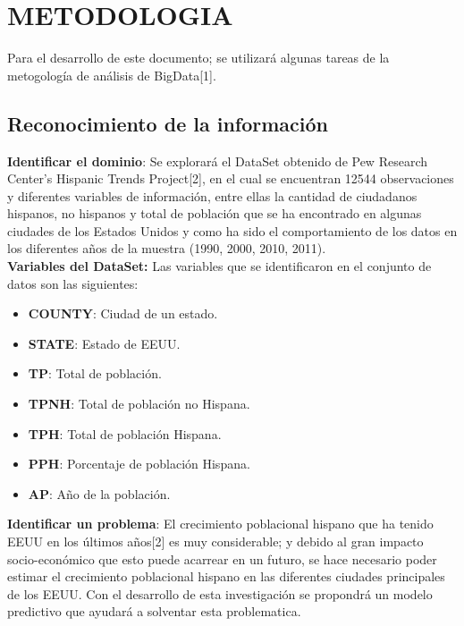 \section{METODOLOGIA}

 Para el desarrollo de este documento; se utilizará algunas tareas de la metogología de análisis de BigData[1].
 
  \subsection{Reconocimiento de la información}
 
  \textbf{Identificar el dominio}: Se explorará el DataSet obtenido de Pew Research Center’s Hispanic Trends Project[2], en el cual se encuentran 12544 observaciones y diferentes variables de información, entre ellas la cantidad de ciudadanos hispanos, no hispanos y total de población que se ha encontrado en algunas ciudades de los Estados Unidos y como ha sido el comportamiento de los datos en los diferentes años de la muestra (1990, 2000, 2010, 2011).\\
   
  \textbf{Variables del DataSet:} Las variables que se identificaron en el conjunto de datos son las siguientes:    	 
   	\begin{itemize}
   	\item \textbf{COUNTY}: Ciudad de un estado.%
    \item \textbf{STATE}: Estado de EEUU.%
   	\item \textbf{TP}: Total de población.%
   	\item \textbf{TPNH}: Total de población no Hispana.%
   	\item \textbf{TPH}: Total de población Hispana.%
   	\item \textbf{PPH}: Porcentaje de población Hispana.%
   	\item \textbf{AP}: Año de la población.%
   \end{itemize}
   
   \textbf{Identificar un problema}: El crecimiento poblacional hispano que ha tenido EEUU en los últimos años[2] es muy considerable; y debido al gran impacto socio-económico que esto puede acarrear en un futuro, se hace necesario poder estimar el crecimiento poblacional hispano en las diferentes ciudades principales de los EEUU. Con el desarrollo de esta investigación se propondrá un modelo predictivo que ayudará a solventar esta problematica.\\ 
    
